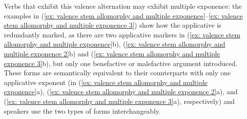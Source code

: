 Verbs that exhibit this valence alternation may exhibit multiple exponence: the examples in (\ref{ex: valence stem allomorphy and multiple exponence}--\ref{ex: valence stem allomorphy and multiple exponence 3}) show how the applicative is redundantly marked, as there are two applicative markers in (\ref{ex: valence stem allomorphy and multiple exponence}b), (\ref{ex: valence stem allomorphy and multiple exponence 2}b) and (\ref{ex: valence stem allomorphy and multiple exponence 3}b), but only one benefactive or malefactive argument introduced. These forms are semantically equivalent to their counterparts with only one applicative exponent (in (\ref{ex: valence stem allomorphy and multiple exponence}a), (\ref{ex: valence stem allomorphy and multiple exponence 2}a), and (\ref{ex: valence stem allomorphy and multiple exponence 3}a), respectively) and speakers use the two types of forms interchangeably.

\ea\label{ex: valence stem allomorphy and multiple exponence}

    \label{ex: valence stem allomorphy and multiple exponencea}
        \label{ex: valence stem allomorphy and multiple exponenceb}
    \z
\z

\ea\label{ex: valence stem allomorphy and multiple exponence 2}

